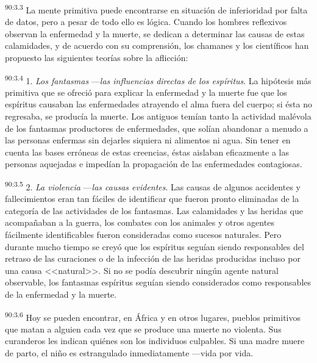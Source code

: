 \par
\textsuperscript{90:3.3} La mente primitiva puede encontrarse en situación de inferioridad por falta de datos, pero a pesar de todo ello es lógica. Cuando los hombres reflexivos observan la enfermedad y la muerte, se dedican a determinar las causas de estas calamidades, y de acuerdo con su comprensión, los chamanes y los científicos han propuesto las siguientes teorías sobre la aflicción:

\par
\textsuperscript{90:3.4} 1. \textit{Los fantasmas} ---\textit{las influencias directas de los espíritus}. La hipótesis más primitiva que se ofreció para explicar la enfermedad y la muerte fue que los espíritus causaban las enfermedades atrayendo el alma fuera del cuerpo; si ésta no regresaba, se producía la muerte. Los antiguos temían tanto la actividad malévola de los fantasmas productores de enfermedades, que solían abandonar a menudo a las personas enfermas sin dejarles siquiera ni alimentos ni agua. Sin tener en cuenta las bases erróneas de estas creencias, éstas aislaban eficazmente a las personas aquejadas e impedían la propagación de las enfermedades contagiosas.

\par
\textsuperscript{90:3.5} 2. \textit{La violencia} ---\textit{las causas evidentes}. Las causas de algunos accidentes y fallecimientos eran tan fáciles de identificar que fueron pronto eliminadas de la categoría de las actividades de los fantasmas. Las calamidades y las heridas que acompañaban a la guerra, los combates con los animales y otros agentes fácilmente identificables fueron consideradas como sucesos naturales. Pero durante mucho tiempo se creyó que los espíritus seguían siendo responsables del retraso de las curaciones o de la infección de las heridas producidas incluso por una causa <<natural>>. Si no se podía descubrir ningún agente natural observable, los fantasmas espíritus seguían siendo considerados como responsables de la enfermedad y la muerte.

\par
\textsuperscript{90:3.6} Hoy se pueden encontrar, en África y en otros lugares, pueblos primitivos que matan a alguien cada vez que se produce una muerte no violenta. Sus curanderos les indican quiénes son los individuos culpables. Si una madre muere de parto, el niño es estrangulado inmediatamente ---vida por vida.

